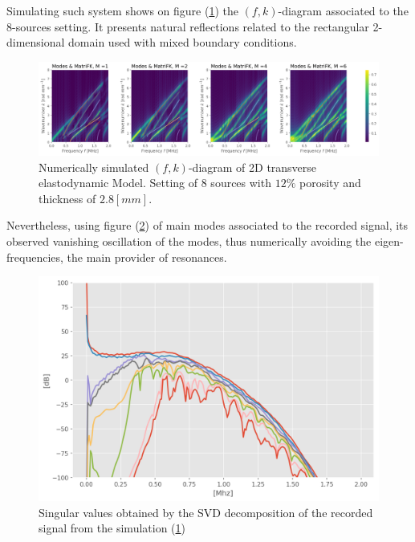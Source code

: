 Simulating such system shows on figure (\ref{FK-DiagramFreqS8P12M28}) the $(f,k)$-diagram associated to the 8-sources setting. It presents natural reflections related to the rectangular 2-dimensional domain used with mixed boundary conditions.
\begin{figure}[!h]
	\centering
	\includegraphics[width=\textwidth]{images/FreqMultSous/2DMixedP12TransIsoFKW28M400_y.png}
	\caption{Numerically simulated $(f,k)$-diagram of 2D transverse elastodynamic Model. Setting of 8 sources with $12\%$ porosity and thickness of $2.8 [mm]$.}
	\label{FK-DiagramFreqS8P12M28}
\end{figure}

Nevertheless, using figure (\ref{SVD-FreqS8P12M28}) of main modes associated to the recorded signal, its observed vanishing oscillation of the modes, thus numerically avoiding the eigen-frequencies, the main provider of resonances.
\begin{figure}[!h]
	\centering
	\includegraphics[scale=.5]{images/FreqMultSous/2D-FreqSimP12W28eKV_SV.png}
	\caption{Singular values obtained by the SVD decomposition of the recorded signal from the simulation (\ref{FK-DiagramFreqS8P12M28})}
	\label{SVD-FreqS8P12M28}
\end{figure}


